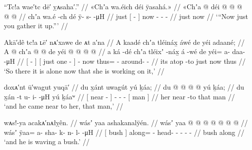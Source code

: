 \ex\label{ex:89-11-you-gather-it-up}%
%
\begingl
	\glpreamble	“Tc!a wae′tc dē′ ỵᴀsaha′.” //
	\glpreamble	«\!Chʼa wa.éich déi ÿasahá.\!» //
	\gla	«\!Chʼa {}  @ {} {} déi
		 @ {} @ {} @ {} @ {} @ {} //
	\glb	\pqp{}chʼa {} wa.é -ch {} dé
		ÿ- {} {} s-  -μH //
	\glc	\pqp{}just {}[  - {}] now
		- \· \· -  - //
	\gld	\pqp{}just {}  {} {} now
		 {} {} {} {} {} //
	\glft	‘“Now just you gather it up.”’
		//
\endgl
\xe

\ex\label{ex:89-12-working-alone}%
%
\begingl
	\glpreamble	Akā′dê tc!a ʟē′ nᴀ′xawe de ᴀt a′na //
	\glpreamble	A kaadé chʼa tléináx̱ áwé de yéi adaané; //
	\gla	{} A  @ {} {}
		{} chʼa  @ {} {}
		 @ {}
		de
		yéi @  @ {} @ {} @ {} //
	\glb	{} a ká -dé {}
		{} chʼa tléixʼ -náx̱ {}
		á -wé
		de
		yéi= a- daa-  -μH //
	\glc	{}[   - {}]
		{}[ just one - {}]
		 -
		now
		thus= - around-  - //
	\gld	{} its atop -to {}
		{} just  {} {}
		 {}
		now
		thus  {} {} {} //
	\glft	‘So there it is alone now that she is working on it,’
		//
\endgl
\xe

\ex\label{ex:89-13-came-near-to-her}%
%
\begingl
	\glpreamble	doxᴀ′nt ū′wagut yuqā′ //
	\glpreamble	du x̱ánt uwagút yú ḵáa; //
	\gla	{} du  @ {} {}
		 @ {} @ {} @ {}
		{} yú ḵáa; {} //
	\glb	{} du x̱án -t {}
		u- i-  -μH
		{} yú ḵáaʷ {} //
	\glc	{}[  near - {}]
		- -  -
		{}[  man {}] //
	\gld	{} her near -to {}
		 {} {} {}
		{} that man {} //
	\glft	‘and he came near to her, that man,’
		//
\endgl
\xe

\ex\label{ex:89-14-waving-a-bush}%
%
\begingl
	\glpreamble	wᴀs!-ya acakᴀ′nᴀłỵên. //
	\glpreamble	wásʼ yaa ashakanalÿén.  //
	\gla	{} wásʼ {}
		yaa @  @ {} @ {} @ {} @ {} @ {} @ {} //
	\glb	{} wásʼ {}
		ÿaa= a- sha- k- n- l-  -μH //
	\glc	{}[ bush {}]
		along= - head- - - -  - //
	\gld	{} bush {}
		along  {} {} {} {} {} {} //
	\glft	‘and he is waving a bush.’
		//
\endgl
\xe

